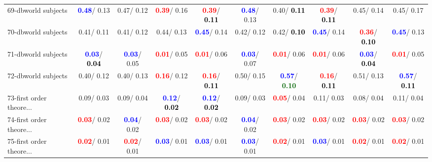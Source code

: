 \begin{table}[h]
\begin{center}
{\begin{tabular}{lc|c|c|c|c|c|c|c|c}
69-dbworld subjects & \textcolor{blue}{\textbf{  0.48}}/  0.13 &   0.47/  0.12 & \textcolor{red}{\textbf{  0.39}}/  0.16 & \textcolor{red}{\textbf{  0.39}}/\textcolor{black}{\textbf{  0.11}} & \textcolor{blue}{\textbf{  0.48}}/  0.13 &   0.40/\textcolor{black}{\textbf{  0.11}} & \textcolor{red}{\textbf{  0.39}}/\textcolor{black}{\textbf{  0.11}} &   0.45/  0.14 &   0.45/  0.17 \\
70-dbworld subjects &   0.41/  0.11 &   0.41/  0.12 &   0.44/  0.13 & \textcolor{blue}{\textbf{  0.45}}/  0.14 &   0.42/  0.12 &   0.42/\textcolor{black}{\textbf{  0.10}} & \textcolor{blue}{\textbf{  0.45}}/  0.14 & \textcolor{red}{\textbf{  0.36}}/\textcolor{black}{\textbf{  0.10}} & \textcolor{blue}{\textbf{  0.45}}/  0.13 \\
71-dbworld subjects & \textcolor{blue}{\textbf{  0.03}}/\textcolor{black}{\textbf{  0.04}} & \textcolor{blue}{\textbf{  0.03}}/  0.05 & \textcolor{red}{\textbf{  0.01}}/  0.05 & \textcolor{red}{\textbf{  0.01}}/  0.06 & \textcolor{blue}{\textbf{  0.03}}/  0.07 & \textcolor{red}{\textbf{  0.01}}/  0.06 & \textcolor{red}{\textbf{  0.01}}/  0.06 & \textcolor{blue}{\textbf{  0.03}}/\textcolor{black}{\textbf{  0.04}} & \textcolor{red}{\textbf{  0.01}}/  0.05 \\ \hline
72-dbworld subjects &   0.40/  0.12 &   0.40/  0.13 & \textcolor{red}{\textbf{  0.16}}/  0.12 & \textcolor{red}{\textbf{  0.16}}/\textcolor{black}{\textbf{  0.11}} &   0.50/  0.15 & \textcolor{blue}{\textbf{  0.57}}/\textcolor{darkgreen}{\textbf{  0.10}} & \textcolor{red}{\textbf{  0.16}}/\textcolor{black}{\textbf{  0.11}} &   0.51/  0.13 & \textcolor{blue}{\textbf{  0.57}}/\textcolor{black}{\textbf{  0.11}} \\
73-first order theore... &   0.09/  0.03 &   0.09/  0.04 & \textcolor{blue}{\textbf{  0.12}}/\textcolor{black}{\textbf{  0.02}} & \textcolor{blue}{\textbf{  0.12}}/\textcolor{black}{\textbf{  0.02}} &   0.09/  0.03 & \textcolor{red}{\textbf{  0.05}}/  0.04 &   0.11/  0.03 &   0.08/  0.04 &   0.11/  0.04 \\
74-first order theore... & \textcolor{red}{\textbf{  0.03}}/  0.02 & \textcolor{blue}{\textbf{  0.04}}/  0.02 & \textcolor{red}{\textbf{  0.03}}/  0.02 & \textcolor{red}{\textbf{  0.03}}/  0.02 & \textcolor{blue}{\textbf{  0.04}}/  0.02 & \textcolor{red}{\textbf{  0.03}}/  0.02 & \textcolor{red}{\textbf{  0.03}}/  0.02 & \textcolor{red}{\textbf{  0.03}}/  0.02 & \textcolor{red}{\textbf{  0.03}}/  0.02 \\
75-first order theore... & \textcolor{red}{\textbf{  0.02}}/  0.01 & \textcolor{red}{\textbf{  0.02}}/  0.01 & \textcolor{blue}{\textbf{  0.03}}/  0.01 & \textcolor{blue}{\textbf{  0.03}}/  0.01 & \textcolor{blue}{\textbf{  0.03}}/  0.01 & \textcolor{red}{\textbf{  0.02}}/  0.01 & \textcolor{blue}{\textbf{  0.03}}/  0.01 & \textcolor{red}{\textbf{  0.02}}/  0.01 & \textcolor{red}{\textbf{  0.02}}/  0.01 \\

\end{tabular}}
\end{center}
\end{table}
